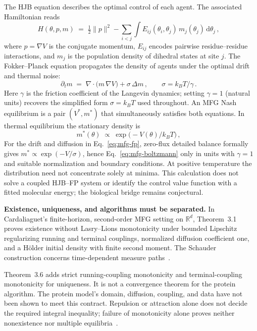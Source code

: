 \documentclass[12pt,a4paper]{article}
\theoremstyle{remark}
\begin{document}
The HJB equation describes the optimal control of each agent. The associated Hamiltonian reads
\begin{equation}\label{eq:mfg-hamiltonian}
  H(\theta,p,m) \;=\; \tfrac{1}{2}\|p\|^{2}
    - \sum_{i<j}\int E_{ij}(\theta_i,\theta_j)\,m_j(\theta_j)\,\mathrm{d}\theta_j\,,
\end{equation}
where $p=\nabla V$ is the conjugate momentum, $E_{ij}$ encodes pairwise residue--residue interactions, and $m_j$ is the population density of dihedral states at site $j$. The Fokker--Planck equation propagates the density of agents under the optimal drift and thermal noise:
\begin{equation}\label{eq:mfg-fp}
  \partial_t m \;=\; \nabla\!\cdot\!\bigl(m\,\nabla V\bigr) + \sigma\,\Delta m\,,
  \qquad \sigma = k_B T / \gamma\,.
\end{equation}
Here $\gamma$ is the friction coefficient of the Langevin dynamics; setting $\gamma = 1$ (natural units) recovers the simplified form $\sigma = k_B T$ used throughout.
An MFG Nash equilibrium is a pair $(V^{*},m^{*})$ that simultaneously satisfies both equations. In thermal equilibrium the stationary density is
\begin{equation}\label{eq:mfg-boltzmann}
  m^{*}(\theta) \;\propto\; \exp\!\bigl(-V(\theta)/k_B T\bigr)\,,
\end{equation}
For the drift and diffusion in Eq.~\eqref{eq:mfg-fp}, zero-flux detailed balance formally gives $m^*\propto\exp(-V/\sigma)$, hence Eq.~\eqref{eq:mfg-boltzmann} only in units with $\gamma=1$ and suitable normalization and boundary conditions. At positive temperature the distribution need not concentrate solely at minima. This calculation does not solve a coupled HJB--FP system or identify the control value function with a fitted molecular energy; the biological bridge remains conjectural.

\textbf{Existence, uniqueness, and algorithms must be separated.} In Cardaliaguet's finite-horizon, second-order MFG setting on $\mathbb R^d$, Theorem~3.1 proves existence without Lasry--Lions monotonicity under bounded Lipschitz regularizing running and terminal couplings, normalized diffusion coefficient one, and a H\"older initial density with finite second moment. The Schauder construction concerns time-dependent measure paths~\citep{Cardaliaguet2013}.

Theorem~3.6 adds strict running-coupling monotonicity and terminal-coupling monotonicity for uniqueness. It is not a convergence theorem for the protein algorithm. The protein model's domain, diffusion, coupling, and data have not been shown to meet this contract. Repulsion or attraction alone does not decide the required integral inequality; failure of monotonicity alone proves neither nonexistence nor multiple equilibria~\citep{Cardaliaguet2013}.
\end{document}
